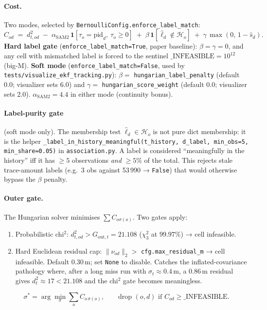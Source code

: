 \documentclass[11pt]{article}
\newcommand{\file}[1]{\texttt{#1}}
\begin{document}
\paragraph{Cost.}
Two modes, selected by \texttt{BernoulliConfig.enforce\_label\_match}:
\begin{equation}\label{eq:cost_sam2}
C_{od} \;=\; d^2_{t,od}
  \;-\;\alpha_{\text{SAM2}}\,\bm 1[\tau_o = \mathrm{pid}_d,\ \tau_o\ge 0]
  \;+\;\beta\,\bm 1[\hat\ell_d \notin \mathcal H_o]
  \;+\;\gamma\,\max(0,\,1-\hat s_d).
\end{equation}
\textbf{Hard label gate} (\texttt{enforce\_label\_match=True}, paper
baseline): $\beta = \gamma = 0$, and any cell with mismatched label is
forced to the sentinel $\_\text{INFEASIBLE}=10^{12}$ (big-M).
\textbf{Soft mode} (\texttt{enforce\_label\_match=False}, used by
\file{tests/visualize\_ekf\_tracking.py}): $\beta=$
\texttt{hungarian\_label\_penalty} (default 0.0; visualizer sets 6.0)
and $\gamma=$ \texttt{hungarian\_score\_weight} (default 0.0; visualizer
sets 2.0). $\alpha_{\text{SAM2}}=4.4$ in either mode (continuity bonus).

\paragraph{Label-purity gate} (soft mode only).
The membership test $\hat\ell_d \in \mathcal H_o$ is not pure dict
membership: it is the helper
\texttt{\_label\_in\_history\_meaningful(t\_history, d\_label, min\_obs=5,
min\_share=0.05)} in \file{association.py}. A label is considered
``meaningfully in the history'' iff it has $\ge 5$ observations \emph{and}
$\ge 5\%$ of the total. This rejects stale trace-amount labels (e.g.\
3 obs against 53\,990 → \texttt{False}) that would otherwise bypass the
$\beta$ penalty.

\paragraph{Outer gate.}
The Hungarian solver minimises $\sum C_{o\sigma(o)}$. Two gates apply:
\begin{enumerate}[leftmargin=1.5em,itemsep=0pt,topsep=2pt]
\item Probabilistic chi$^2$: $d^2_{t,od} > G_{\text{out},t}=21.108$
  ($\chi^2_3$ at $99.97\%$) → cell infeasible.
\item Hard Euclidean residual cap: $\|\nu_{od}\|_2 > $
  \texttt{cfg.max\_residual\_m} → cell infeasible. Default $0.30$\,m;
  set \texttt{None} to disable. Catches the inflated-covariance
  pathology where, after a long miss run with $\sigma_t \approx 0.4$\,m,
  a $0.86$\,m residual gives $d^2_t \approx 17 < 21.108$ and the chi$^2$
  gate becomes meaningless.
\end{enumerate}
\begin{equation}\label{eq:hung}
\sigma^* = \arg\min_\sigma \sum_{o} C_{o\,\sigma(o)},\qquad
\text{drop } (o,d) \text{ if } C_{od} \ge \_\text{INFEASIBLE}.
\end{equation}
\end{document}
